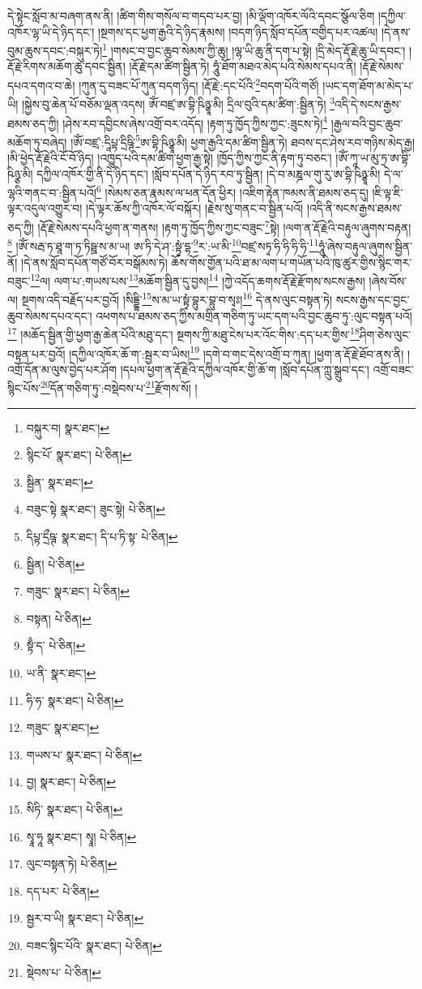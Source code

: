 དེ་སྟེང་སློབ་མ་བཞག་ནས་ནི། །ཚིག་གིས་གསོལ་བ་གདབ་པར་བྱ། །མི་ལྡོག་འཁོར་ལོའི་དབང་སྩོལ་ཅིག །དཀྱིལ་འཁོར་ལྷ་ཡི་དེ་ཉིད་དང་། །སྔགས་དང་ཕྱག་རྒྱའི་དེ་ཉིད་རྣམས། །བདག་ཉིད་སློབ་དཔོན་བགྱིད་པར་འཚལ། །དེ་ནས་བུམ་ཆུས་དབང་:བསྐུར་ཏེ།\footnote{བསྐུར་བ།  སྣར་ཐང་། } །གསང་བ་བྱང་ཆུབ་སེམས་ཀྱི་ཆུ། །ལྷ་ཡི་ཆུ་ནི་དག་པ་སྟེ། །དྲི་མེད་རྡོ་རྗེ་ཆུ་ཡི་དབང་། །རྡོ་རྗེ་རིགས་མཆོག་ཆུ་དབང་སྦྱིན། །རྡོ་རྗེ་དམ་ཚིག་སྦྱིན་ཏེ། ཧཱུཾ་ཐོག་མཐའ་མེད་པའི་སེམས་དཔའ་ནི། །རྡོ་རྗེ་སེམས་དཔའ་དགའ་བ་ཆེ། །ཀུན་དུ་བཟང་པོ་ཀུན་བདག་ཉིད། །རྡོ་རྗེ་:དང་པོའི་\footnote{སྙིང་པོ་  སྣར་ཐང་།  པེ་ཅིན། }བདག་པོའི་གཙོ། །ཡང་དག་ཐོག་མ་མེད་པ་ཡི། །སྐྱེས་བུ་ཆེན་པོ་བཅོམ་ལྡན་འདས། ཨོཾ་བཛྲ་ཨ་བྷི་ཥིཉྩཱ་མི། དྲིལ་བུའི་དམ་ཚིག་:སྦྱིན་ཏེ། \footnote{སྦྱིན་  སྣར་ཐང་། }འདི་དེ་སངས་རྒྱས་ཐམས་ཅད་ཀྱི། །ཤེས་རབ་དབྱིངས་ཞེས་འགྲོ་བར་འདོད། །རྟག་ཏུ་ཁྱོད་ཀྱིས་ཀྱང་:ཟུངས་ཏེ།\footnote{བཟུང་སྟེ  སྣར་ཐང་། ཟུང་སྟེ།  པེ་ཅིན། } །རྒྱལ་བའི་བྱང་ཆུབ་མཆོག་ཏུ་བཞེད། །ཨོཾ་བཛྲ་:དཱིཔྟ་དྲིཥྚི་\footnote{དིཔྟ་དྲྀཥྚ་  སྣར་ཐང་། དི་པ་ཏི་སྟ་  པེ་ཅིན། }ཨ་བྷི་ཥིཉྩཱ་མི། ཕྱག་རྒྱའི་དམ་ཚིག་སྦྱིན་ཏེ། ཐབས་དང་ཤེས་རབ་གཉིས་མེད་རྒྱ། །མི་ཕྱེད་རྡོ་རྗེའི་ངོ་བོ་ཉིད། །འཁྱུད་པའི་དམ་ཚིག་ཕྱག་རྒྱ་སྟེ། །ཁྱོད་ཀྱིས་ཀྱང་ནི་རྟག་ཏུ་བཅང་། །ཨོཾ་ཀཱ་ཡ་མུ་ཏྲ་ཨ་བྷི་ཥིཉྩ་མི། དཀྱིལ་འཁོར་གྱི་ནི་དེ་ཉིད་དང་། །སློབ་དཔོན་དེ་ཉིད་རབ་ཏུ་སྦྱིན། །དེ་བ་མཎྜལ་གུ་རུ་ཨ་བྷི་ཥིཉྩཱ་མི། དེ་ལ་ལྷའི་གནང་བ་:སྦྱིན་པའོ།\footnote{སྦྱིན།  པེ་ཅིན། } །སེམས་ཅན་རྣམས་ལ་ཕན་དོན་ཕྱིར། །འཇིག་རྟེན་ཁམས་ནི་ཐམས་ཅད་དུ། །ཇི་ལྟ་ཇི་ལྟར་འདུལ་འགྱུར་བ། །དེ་ལྟར་ཆོས་ཀྱི་འཁོར་ལོ་བསྐོར། །རྗེས་སུ་གནང་བ་སྦྱིན་པའོ། །འདི་ནི་སངས་རྒྱས་ཐམས་ཅད་ཀྱི། །རྡོ་རྗེ་སེམས་དཔའི་ཕྱག་ན་གནས། །རྟག་ཏུ་ཁྱོད་ཀྱིས་ཀྱང་བཟུང་\footnote{གཟུང་  སྣར་ཐང་།  པེ་ཅིན། }སྟེ། །ལག་ན་རྡོ་རྗེའི་བརྟུལ་ཞུགས་བརྟན།\footnote{བསྟན།  པེ་ཅིན། } །ཨོཾ་སརྦ་ཏ་ཐཱ་ག་ཏ་ཏིཥྛ་ས་མ་ཡ། ཨ་ཏི་དེ་ཤ་:སྟྭཾ་དྷ་\footnote{སྟྃ་ད་  པེ་ཅིན། }ར་:ཡ་མི་\footnote{ཡ་ནི་  སྣར་ཐང་། }བཛྲ་སཏྭ་ཧི་ཧི་ཧི་ཧི་\footnote{ཧི་ཧ་  སྣར་ཐང་།  པེ་ཅིན། }ཧཱུཾ་ཞེས་བརྟུལ་ཞུགས་སྦྱིན་ནོ། །དེ་ནས་སློབ་དཔོན་གཙོ་བོར་བསྒོམས་ཏེ། ཆོས་གོས་གྱོན་པའི་ཐ་མ་ལག་པ་གཡོན་པའི་ཁུ་ཚུར་གྱིས་སྙིང་གར་བཟུང་\footnote{གཟུང་  སྣར་ཐང་། }ལ། ལག་པ་:གཡས་པས་\footnote{གཡས་པ་  སྣར་ཐང་།  པེ་ཅིན། }མཆོག་སྦྱིན་དུ་བྱས།\footnote{བྱ།  སྣར་ཐང་།  པེ་ཅིན། } །ཀྱེ་འདོད་ཆགས་རྡོ་རྗེ་རྫོགས་སངས་རྒྱས། །ཞེས་བོས་ལ། སྔགས་འདི་བརྗོད་པར་བྱའོ། །སིདྡྷི་\footnote{སིཏི་  སྣར་ཐང་།  པེ་ཅིན། }ས་མ་ཡ་སྟྭཾ་བྷུར་བྷུ་བ་སྭཿ།\footnote{སྭཱ་ཧཱ  སྣར་ཐང་། སྭཱ།  པེ་ཅིན། } དེ་ནས་ལུང་བསྟན་ཏེ། སངས་རྒྱས་དང་བྱང་ཆུབ་སེམས་དཔའ་དང་། འཕགས་པ་ཐམས་ཅད་ཀྱིས་མགྲིན་གཅིག་ཏུ་ཡང་དག་པའི་བྱང་ཆུབ་ཏུ་:ལུང་བསྟན་པའོ།\footnote{ལུང་བསྟན་ཏེ།  པེ་ཅིན། } །མཆོད་སྦྱིན་གྱི་ཕྱག་རྒྱ་ཆེན་པོའི་མཐུ་དང་། སྔགས་ཀྱི་མཐུ་ངེས་པར་འོང་གིས་:དད་པར་གྱིས་\footnote{དད་པར་  པེ་ཅིན། }ཤིག་ཅེས་ལུང་བསྟན་པར་བྱའོ། །དཀྱིལ་འཁོར་ཆོ་ག་:སྦྱར་བ་ཡིས།\footnote{སྦྱར་བ་ཡི།  སྣར་ཐང་།  པེ་ཅིན། } །དགེ་བ་གང་དེས་འགྲོ་བ་ཀུན། །ཕྱག་ན་རྡོ་རྗེ་ཐོབ་ནས་ནི། །འགྲོ་དོན་མ་ལུས་བྱེད་པར་ཤོག །དཔལ་ཕྱག་ན་རྡོ་རྗེའི་དཀྱིལ་འཁོར་གྱི་ཆོ་ག །སློབ་དཔོན་ཀླུ་སྒྲུབ་དང་། འགྲོ་བཟང་སྙིང་པོས་\footnote{བཟང་སྙིང་པོའི་  སྣར་ཐང་།  པེ་ཅིན། }དོན་གཅིག་ཏུ་:བསྡེབས་པ་\footnote{སྡེབས་པ་  པེ་ཅིན། }རྫོགས་སོ། ། 